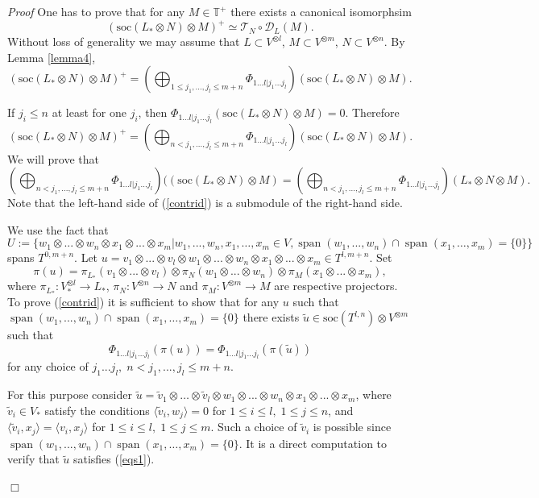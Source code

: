 \documentclass[11pt]{amsart}
\renewenvironment{proof}{ \emph{Proof}}{$\Box$}
\newcommand{\refle}[1]{Lemma \ref{#1}}
\newcommand{\refeq}[1]{(\ref{#1})}
\newcommand{\soc}{\mathrm{soc}}
\newcommand{\field}[1]{\mathbb{#1}}
\begin{document}
\begin{proof} One has to prove that
for any $M\in\field{T}^+$ there exists a canonical isomorphsim
$$(\soc( L_*\otimes N)\otimes M)^+\simeq  \mathcal T_N\circ\mathcal D_L(M).$$
Without loss of generality we may assume that $L\subset V^{\otimes  l}$, $M\subset V^{\otimes m}$, $N\subset V^{\otimes n}$.
By \refle{lemma4}, 
$$(\soc(L_*\otimes N)\otimes M)^+=\left(\bigoplus_{1\leq j_1,...,j_l\leq m+n}\Phi_{1...l|j_1...j_l}\right)(\soc(L_*\otimes N)\otimes M).$$

If $j_i\leq n$ at least for one $j_i$, then $\Phi_{1...l|j_1...j_l}(\soc(L_*\otimes N)\otimes M)=0$.
Therefore 
$$(\soc(L_*\otimes N)\otimes M)^+=\left(\bigoplus_{n< j_1,...,j_l\leq m+n}\Phi_{1...l|j_1...j_l}\right)(\soc(L_*\otimes N)\otimes M).$$
We will prove that  
\begin{equation}\label{contrid}
\left(\bigoplus_{n<j_1,...,j_l\leq
    m+n}\Phi_{1...l|j_1...j_l}\right)((\soc(L_*\otimes N)\otimes
M)=\left(\bigoplus_{n<j_1,...,j_l\leq
    m+n}\Phi_{1...l|j_1...j_l}\right)(L_*\otimes N\otimes M).
\end{equation}
Note that the left-hand side of (\ref{contrid}) is a submodule of the right-hand side. 

We use the fact that  
$$U:=\{w_1\otimes...\otimes w_n\otimes x_1\otimes ...\otimes x_m | w_1,...,w_n,x_1,\dots,x_m\in V, \operatorname{span} (w_1,...,w_n)\cap \operatorname{span} (x_1,\dots,x_m)=\{0\}\}$$
spans $T^{0,m+n}$. Let
$u=v_1\otimes ...\otimes v_l\otimes w_1\otimes ...\otimes w_n\otimes x_1\otimes ...\otimes x_m\in T^{l,m+n}$.
Set
$$\pi(u)=\pi_{L_*}(v_1\otimes ...\otimes v_l)\otimes\pi_N( w_1\otimes ...\otimes w_n)\otimes\pi_M(x_1\otimes ...\otimes x_m),$$
where $\pi_{L_*}: V_*^{\otimes l}\to L_*$, $\pi_N: V^{\otimes n}\to N$ and $\pi_M: V^{\otimes m}\to M$ are respective projectors.
To prove (\ref{contrid}) it is sufficient to show that for any $u$
such that $\operatorname{span} (w_1,...,w_n)\cap \operatorname{span} (x_1,\dots,x_m)=\{0\}$
there exists 
$\tilde{u}\in\soc (T^{l,n})\otimes V^{\otimes  m}$
such that 
\begin{equation}\label{eqs1}
\Phi_{1...l|j_1...j_l}(\pi(u))=\Phi_{1...l|j_1...j_l}(\pi(\tilde{u})) 
\end{equation}
for any choice of $j_1...j_l,\; n<j_1,...,j_l\leq m+n$.

For this purpose consider $\tilde{u}=\tilde{v}_1\otimes\dots\otimes\tilde{v}_l\otimes w_1\otimes...\otimes w_n\otimes x_1\otimes ...\otimes x_m $, 
where $\tilde{v}_i\in V_*$ satisfy the conditions 
$\langle \tilde{v}_i,w_j \rangle=0$
for $1\leq i\leq l,\; 1\leq j\leq n$, and $\langle \tilde{v}_i,x_j \rangle=\langle v_i,x_j \rangle$
for $1\leq i\leq l,\; 1\leq j\leq m$. Such a choice of $\tilde{v}_i$ is
possible since  $\operatorname{span} (w_1,...,w_n)\cap \operatorname{span} (x_1,\dots,x_m)=\{0\}$. 
It is a direct computation to verify that $\tilde{u}$ satisfies \refeq{eqs1}.


\end{proof}
\end{document}
